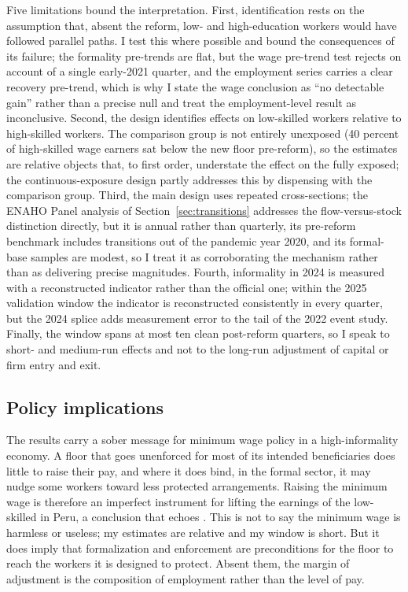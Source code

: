 Five limitations bound the interpretation. First, identification rests on the assumption that, absent the reform, low- and high-education workers would have followed parallel paths. I test this where possible and bound the consequences of its failure; the formality pre-trends are flat, but the wage pre-trend test rejects on account of a single early-2021 quarter, and the employment series carries a clear recovery pre-trend, which is why I state the wage conclusion as ``no detectable gain'' rather than a precise null and treat the employment-level result as inconclusive. Second, the design identifies effects on low-skilled workers relative to high-skilled workers. The comparison group is not entirely unexposed (40 percent of high-skilled wage earners sat below the new floor pre-reform), so the estimates are relative objects that, to first order, understate the effect on the fully exposed; the continuous-exposure design partly addresses this by dispensing with the comparison group. Third, the main design uses repeated cross-sections; the ENAHO Panel analysis of Section~\ref{sec:transitions} addresses the flow-versus-stock distinction directly, but it is annual rather than quarterly, its pre-reform benchmark includes transitions out of the pandemic year 2020, and its formal-base samples are modest, so I treat it as corroborating the mechanism rather than as delivering precise magnitudes. Fourth, informality in 2024 is measured with a reconstructed indicator rather than the official one; within the 2025 validation window the indicator is reconstructed consistently in every quarter, but the 2024 splice adds measurement error to the tail of the 2022 event study. Finally, the window spans at most ten clean post-reform quarters, so I speak to short- and medium-run effects and not to the long-run adjustment of capital or firm entry and exit.

\subsection{Policy implications}

The results carry a sober message for minimum wage policy in a high-informality economy. A floor that goes unenforced for most of its intended beneficiaries does little to raise their pay, and where it does bind, in the formal sector, it may nudge some workers toward less protected arrangements. Raising the minimum wage is therefore an imperfect instrument for lifting the earnings of the low-skilled in Peru, a conclusion that echoes \citet{jaramillo_lopez_2006}. This is not to say the minimum wage is harmless or useless; my estimates are relative and my window is short. But it does imply that formalization and enforcement are preconditions for the floor to reach the workers it is designed to protect. Absent them, the margin of adjustment is the composition of employment rather than the level of pay.
